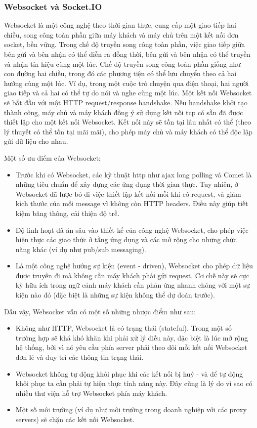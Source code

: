 \subsubsection{Websocket và Socket.IO}
Websocket là một công nghệ theo thời gian thực, cung cấp một giao tiếp hai
chiều, song công toàn phần giữa máy khách và máy chủ trên một kết nối đơn
socket, bền vững. Trong chế độ truyền song công toàn phần, việc giao tiếp giữa
bên gửi và bên nhận có thể diễn ra đồng thời, bên gửi và bên nhận có thể truyền
và nhận tín hiệu cùng một lúc. Chế độ truyền song công toàn phần giống như con
đường hai chiều, trong đó các phương tiện có thể lưu chuyển theo cả hai hướng
cùng một lúc. Ví dụ, trong một cuộc trò chuyện qua điện thoại, hai người giao
tiếp và cả hai có thể tự do nói và nghe cùng một lúc. Một kết nối Websocket sẽ
bắt đầu với một HTTP request/response handshake. Nếu handshake khởi tạo thành
công, máy chủ và máy khách đồng ý sử dụng kết nối \acrshort*{tcp} có sẵn đã được thiết lập
cho một kết nối Websocket. Kết nối này sẽ tồn tại lâu nhất có thể (theo lý
thuyết có thể tồn tại mãi mãi), cho phép máy chủ và máy khách có thể độc lập
gửi dữ liệu cho nhau.
\par
Một số ưu điểm của Websocket:
\begin{itemize}
    \item Trước khi có Websocket, các kỹ thuật \acrshort*{http} như \acrshort*{ajax} long polling và Comet là
          những tiêu chuẩn để xây dựng các ứng dụng thời gian thực. Tuy nhiên, ở
          Websocket đã lược bỏ đi việc thiết lập kết nối mỗi khi có request, và giảm kích
          thước của mỗi message vì không còn HTTP headers. Điều này giúp tiết kiệm băng
          thông, cải thiện độ trễ.
    \item Độ linh hoạt đã ăn sâu vào thiết kế của công nghệ Websocket, cho phép việc hiện thực các giao thức ở tầng ứng dụng và các mở rộng cho những chức năng khác (ví dụ như pub/sub messaging).
    \item Là một công nghệ hướng sự kiện (event - driven), Websocket cho phép dữ liệu
          được truyền đi mà không cần máy khách phải gửi request. Cơ chế này sẽ cực kỳ
          hữu ích trong ngữ cảnh máy khách cần phản ứng nhanh chóng với một sự kiện nào
          đó (đặc biệt là những sự kiện không thể dự đoán trước).
\end{itemize}
\par
Dẫu vậy, Websocket vẫn có một số những nhược điểm như sau:
\begin{itemize}
    \item Không như HTTP, Websocket là có trạng thái (stateful). Trong một số trường hợp
          sẽ khá khó khăn khi phải xử lý điều này, đặc biệt là lúc mở rộng hệ thống, bởi
          vì nó yêu cầu phía server phải theo dõi mỗi kết nối Websocket đơn lẻ và duy trì
          các thông tin trạng thái.
    \item Websocket không tự động khôi phục khi các kết nối bị huỷ - và để tự động khôi
          phục ta cần phải tự hiện thực tính năng này. Đây cũng là lý do vì sao có nhiều
          thư viện hỗ trợ Websocket phía máy khách.
    \item Một số môi trường (ví dụ như môi trường trong doanh nghiệp với các proxy
          servers) sẽ chặn các kết nối Websocket.
\end{itemize}
